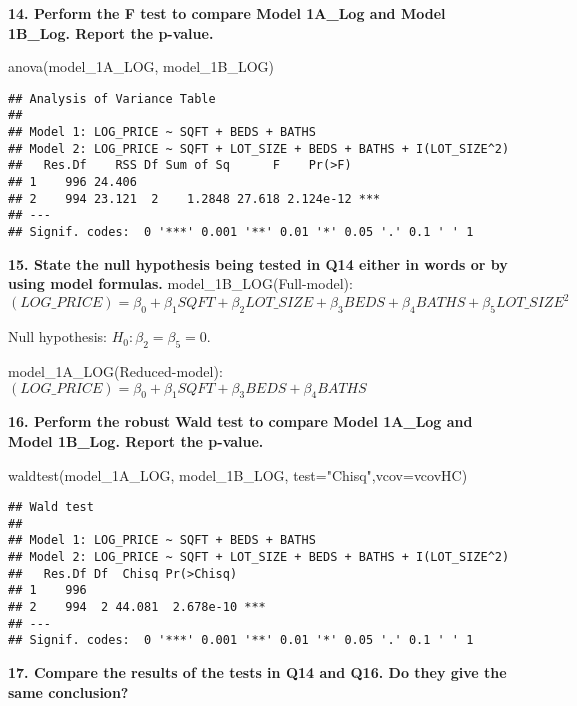 \documentclass[
]{article}
\newenvironment{Shaded}{\begin{snugshade}}{\end{snugshade}}
\newcommand{\AttributeTok}[1]{\textcolor[rgb]{0.77,0.63,0.00}{#1}}
\newcommand{\FunctionTok}[1]{\textcolor[rgb]{0.00,0.00,0.00}{#1}}
\newcommand{\NormalTok}[1]{#1}
\newcommand{\StringTok}[1]{\textcolor[rgb]{0.31,0.60,0.02}{#1}}
\begin{document}
\textbf{14. Perform the F test to compare Model 1A\_Log and Model
1B\_Log. Report the p-value.}

\begin{Shaded}
\begin{Highlighting}[]
\FunctionTok{anova}\NormalTok{(model\_1A\_LOG, model\_1B\_LOG)}
\end{Highlighting}
\end{Shaded}

\begin{verbatim}
## Analysis of Variance Table
## 
## Model 1: LOG_PRICE ~ SQFT + BEDS + BATHS
## Model 2: LOG_PRICE ~ SQFT + LOT_SIZE + BEDS + BATHS + I(LOT_SIZE^2)
##   Res.Df    RSS Df Sum of Sq      F    Pr(>F)    
## 1    996 24.406                                  
## 2    994 23.121  2    1.2848 27.618 2.124e-12 ***
## ---
## Signif. codes:  0 '***' 0.001 '**' 0.01 '*' 0.05 '.' 0.1 ' ' 1
\end{verbatim}

\textbf{15. State the null hypothesis being tested in Q14 either in
words or by using model formulas.} model\_1B\_LOG(Full-model):
\((LOG\_PRICE)=\beta_0 + \beta_1 SQFT + \beta_2 LOT\_SIZE + \beta_3 BEDS + \beta_4 BATHS + \beta_5 LOT\_SIZE^2\)

Null hypothesis: \(H_0:\beta_2=\beta_5 = 0\).

model\_1A\_LOG(Reduced-model):
\((LOG\_PRICE)=\beta_0 + \beta_1 SQFT + \beta_3 BEDS + \beta_4 BATHS\)

\textbf{16. Perform the robust Wald test to compare Model 1A\_Log and
Model 1B\_Log. Report the p-value.}

\begin{Shaded}
\begin{Highlighting}[]
\FunctionTok{waldtest}\NormalTok{(model\_1A\_LOG, model\_1B\_LOG, }\AttributeTok{test=}\StringTok{"Chisq"}\NormalTok{,}\AttributeTok{vcov=}\NormalTok{vcovHC)}
\end{Highlighting}
\end{Shaded}

\begin{verbatim}
## Wald test
## 
## Model 1: LOG_PRICE ~ SQFT + BEDS + BATHS
## Model 2: LOG_PRICE ~ SQFT + LOT_SIZE + BEDS + BATHS + I(LOT_SIZE^2)
##   Res.Df Df  Chisq Pr(>Chisq)    
## 1    996                         
## 2    994  2 44.081  2.678e-10 ***
## ---
## Signif. codes:  0 '***' 0.001 '**' 0.01 '*' 0.05 '.' 0.1 ' ' 1
\end{verbatim}

\textbf{17. Compare the results of the tests in Q14 and Q16. Do they
give the same conclusion?}
\end{document}
